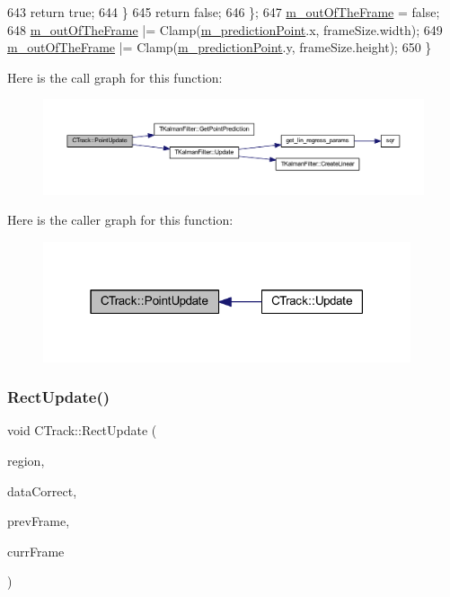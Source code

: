 \begin{DoxyCode}
643             \textcolor{keywordflow}{return} \textcolor{keyword}{true};
644         \}
645         \textcolor{keywordflow}{return} \textcolor{keyword}{false};
646     \};
647     \mbox{\hyperlink{class_c_track_ad97c3e53969dbb60e7690c4f2d038172}{m\_outOfTheFrame}} = \textcolor{keyword}{false};
648     \mbox{\hyperlink{class_c_track_ad97c3e53969dbb60e7690c4f2d038172}{m\_outOfTheFrame}} |= Clamp(\mbox{\hyperlink{class_c_track_a8ee3f8baaf290aeb113f34c26a446a76}{m\_predictionPoint}}.x, frameSize.width);
649     \mbox{\hyperlink{class_c_track_ad97c3e53969dbb60e7690c4f2d038172}{m\_outOfTheFrame}} |= Clamp(\mbox{\hyperlink{class_c_track_a8ee3f8baaf290aeb113f34c26a446a76}{m\_predictionPoint}}.y, frameSize.height);
650 \}
\end{DoxyCode}
Here is the call graph for this function\+:\nopagebreak
\begin{figure}[H]
\begin{center}
\leavevmode
\includegraphics[width=350pt]{class_c_track_a19453a750a9ec71d6f3465f6031ad64b_cgraph}
\end{center}
\end{figure}
Here is the caller graph for this function\+:\nopagebreak
\begin{figure}[H]
\begin{center}
\leavevmode
\includegraphics[width=307pt]{class_c_track_a19453a750a9ec71d6f3465f6031ad64b_icgraph}
\end{center}
\end{figure}
\mbox{\label{class_c_track_a0f4fc1dc488e8ae339e988962dae6873}} 
\subsubsection{\texorpdfstring{Rect\+Update()}{RectUpdate()}}
{\footnotesize\ttfamily void C\+Track\+::\+Rect\+Update (\begin{DoxyParamCaption}\item[{const \mbox{\hyperlink{class_c_region}{C\+Region}} \&}]{region,  }\item[{bool}]{data\+Correct,  }\item[{cv\+::\+U\+Mat}]{prev\+Frame,  }\item[{cv\+::\+U\+Mat}]{curr\+Frame }\end{DoxyParamCaption})\hspace{0.3cm}{\ttfamily [private]}}


